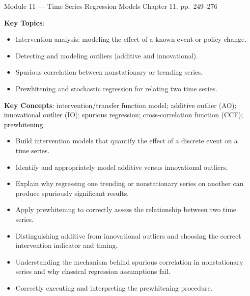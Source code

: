 \documentclass[11pt]{article}
\newcommand{\keytopics}{\textbf{\color{modblue}Key Topics}}
\newcommand{\keyconcepts}{\textbf{\color{modblue}Key Concepts}}
\begin{document}
\vspace{6pt}
\begin{moduletitle}{Module 11 --- Time Series Regression Models}
\small Chapter 11, pp.\ 249--276
\end{moduletitle}

\keytopics:
\begin{itemize}
  \item Intervention analysis: modeling the effect of a known event or policy change.
  \item Detecting and modeling outliers (additive and innovational).
  \item Spurious correlation between nonstationary or trending series.
  \item Prewhitening and stochastic regression for relating two time series.
\end{itemize}

\keyconcepts: intervention/transfer function model; additive outlier (AO); innovational outlier (IO); spurious regression; cross-correlation function (CCF); prewhitening.

\begin{objectives}
\begin{itemize}
  \item Build intervention models that quantify the effect of a discrete event on a time series.
  \item Identify and appropriately model additive versus innovational outliers.
  \item Explain why regressing one trending or nonstationary series on another can produce spuriously significant results.
  \item Apply prewhitening to correctly assess the relationship between two time series.
\end{itemize}
\end{objectives}

\begin{difficult}
\begin{itemize}
  \item Distinguishing additive from innovational outliers and choosing the correct intervention indicator and timing.
  \item Understanding the mechanism behind spurious correlation in nonstationary series and why classical regression assumptions fail.
  \item Correctly executing and interpreting the prewhitening procedure.
\end{itemize}
\end{difficult}
\end{document}
